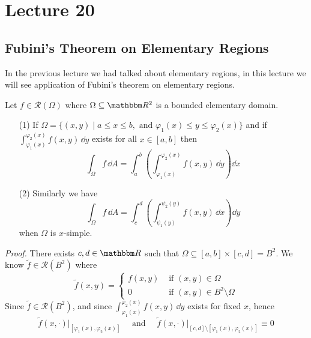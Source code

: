 \documentclass[../Analysis-3]{subfiles}
\begin{document}
\chapter*{Lecture 20} %
\setcounter{chapter}{20} %
\setcounter{section}{0}

\section{Fubini's Theorem on Elementary Regions}

In the previous lecture we had talked about elementary regions, in this lecture we will see application of Fubini's theorem on elementary regions. 

\begin{Thm}{}{}\label{thm1:20}
    Let $f \in \mathscr{R}(\Omega)$ where $\Omega \subseteq \R^2$ is a bounded elementary domain. 
    \begin{enumerate}
        \item[(1)] If $\Omega = \{ (x,y) \mid a \leq x \leq b, \mbox{ and } \varphi_1(x) \leq y \leq \varphi_2(x) \}$ and if $\displaystyle{\int_{\varphi_1(x)}^{\varphi_2(x)}f(x,y) \, \dd y}$ exists for all $x \in [a,b]$ then 
        \[
            \int_{\Omega} f \, \dd A = \int_a^b \left( \int_{\varphi_1(x)}^{\varphi_2(x)} f(x,y) \, \dd y\right) \dd x    
        \]

        \item[(2)] Similarly we have 
        \[
            \int_{\Omega} f \, \dd A = \int_c^d \left( \int_{\psi_1(y)}^{\psi_2(y)} f(x,y) \, \dd x\right) \dd y    
        \]
        when $\Omega$ is $x$-simple. 
    \end{enumerate}
\end{Thm}
\textit{Proof.} There exists $c,d \in \R$ such that $\Omega \subseteq [a,b] \times [c,d] = B^2$. We know $\tilde{f} \in \mathscr{R}(B^2)$ where 
\[
    \tilde{f}(x,y) = \begin{cases}
        f(x,y) & \mbox{ if } (x,y) \in \Omega \\ 
        0 & \mbox{ if } (x,y) \in B^2 \setminus \Omega
    \end{cases}    
\]
Since $\tilde{f} \in \mathscr{R}(B^2)$, and since $\displaystyle{\int_{\varphi_1(x)}^{\varphi_2(x)} f(x,y) \, \dd y}$ exists for fixed $x$, hence 
\[
    \tilde{f}(x,\cdot)\big\vert_{[\varphi_1(x),\varphi_2(x)]} \quad \mbox{ and } \quad \tilde{f}(x,\cdot)\big\vert_{[c,d]\setminus[\varphi_1(x),\varphi_2(x)]} \equiv 0    
\]
\end{document}
